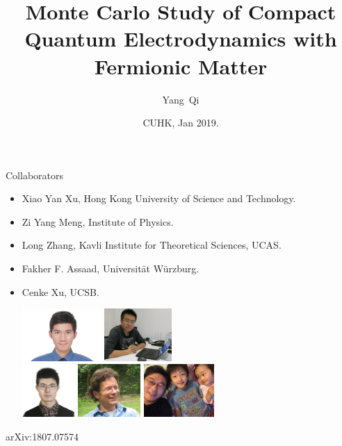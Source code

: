 \documentclass[xcolor=table, 10pt, aspectratio=43]{beamer}
\title[EQMC] %
{Monte Carlo Study of Compact Quantum Electrodynamics with Fermionic Matter}
\author[Y Qi] %
{Yang~Qi}
\institute[Fudan] %
{
Department of Physics, Fudan University.
}
\date{CUHK, Jan 2019.}
\begin{document}
\begin{frame}
  \titlepage
\end{frame}

\begin{frame}{Collaborators}
\begin{itemize}
\item Xiao Yan Xu, Hong Kong University of Science and Technology.
\item Zi Yang Meng, Institute of Physics.
\item Long Zhang, Kavli Institute for Theoretical Sciences, UCAS.
\item Fakher F. Assaad, Universit\"at W\"urzburg.
\item Cenke Xu, UCSB.
\begin{center}
  \includegraphics[height=2cm]{../people/xiaoyanxu}
  \includegraphics[height=2cm]{../people/ziyangmeng}\\
  \includegraphics[height=2cm]{../people/zhanglong}
  \includegraphics[height=2cm]{../people/fakher}
  \includegraphics[height=2cm]{../people/cenke}
\end{center}
\end{itemize}
\begin{center}
  \small arXiv:1807.07574
\end{center}
\end{frame}
\end{document}
